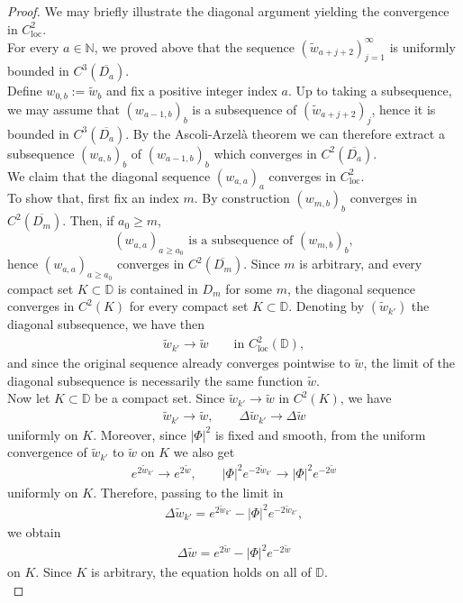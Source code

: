 \documentclass[a4paper,11pt,openright,twoside]{book}
\newcommand{\N}{\mathbb{N}}
\newcommand{\1}{\mathds{1}}
\newcommand{\loc}{\mathrm{loc}}
\theoremstyle{plain}
\theoremstyle{definition}
\theoremstyle{remark}
\begin{document}
\begin{proof}
	We may briefly illustrate the diagonal argument yielding the convergence in $C^2_\loc$.\\
	For every $a\in \N$, we proved above that the sequence $(\tilde w_{a+j+2})_{j=1}^\infty$ is uniformly bounded in $C^3(\overline{D_a})$.\\
	Define $w_{0,b}:=\tilde w_b$ and fix a positive integer index $a$. Up to taking a subsequence, we may assume that $(w_{a-1,b})_b$ is a subsequence of $(\tilde w_{a+j+2})_j$, hence it is bounded in $C^3(\overline{D_a})$. By the Ascoli-Arzelà theorem we can therefore extract a subsequence $(w_{a,b})_b$ of $(w_{a-1,b})_b$ which converges in $C^2(\overline{D_a})$.\\
	We claim that the diagonal sequence $(w_{a,a})_a$ converges in $C^2_\loc$.\\
	To show that, first fix an index $m$. By construction $(w_{m,b})_b$ converges in $C^2(\overline{D_m})$. Then, if $a_0\geq m$,
	\[
	(w_{a,a})_{a\geq a_0} \text{ is a subsequence of } (w_{m,b})_b,
	\]
	hence $(w_{a,a})_{a\geq a_0}$ converges in $C^2(\overline{D_m})$. Since $m$ is arbitrary, and every compact set $K\subset \mathbb{D}$ is contained in $D_m$ for some $m$, the diagonal sequence converges in $C^2(K)$ for every compact set $K\subset \mathbb{D}$. Denoting by $(\tilde w_{k'})$ the diagonal subsequence, we have then
	\begin{align*}
		\tilde w_{k'}\to \tilde w \qquad \text{in } C^2_\loc(\mathbb{D}),
	\end{align*}
	and since the original sequence already converges pointwise to $\tilde w$, the limit of the diagonal subsequence is necessarily the same function $\tilde w$.\\


	Now let $K\subset \mathbb{D}$ be a compact set. Since $\tilde w_{k'}\to \tilde w$ in $C^2(K)$, we have
	\begin{align*}
		\tilde w_{k'}\to \tilde w,\qquad \Delta \tilde w_{k'}\to \Delta \tilde w
	\end{align*}
	uniformly on $K$. Moreover, since $|\Phi|^2$ is fixed and smooth, from the uniform convergence of $\tilde w_{k'}$ to $\tilde w$ on $K$ we also get
	\begin{align*}
		e^{2\tilde w_{k'}}\to e^{2\tilde w},\qquad |\Phi|^2e^{-2\tilde w_{k'}}\to |\Phi|^2e^{-2\tilde w}
	\end{align*}
	uniformly on $K$. Therefore, passing to the limit in
	\begin{align*}
		\Delta \tilde w_{k'}=e^{2\tilde w_{k'}}-|\Phi|^2e^{-2\tilde w_{k'}},
	\end{align*}
	we obtain
	\begin{align*}
		\Delta \tilde w=e^{2\tilde w}-|\Phi|^2e^{-2\tilde w}
	\end{align*}
	on $K$. Since $K$ is arbitrary, the equation holds on all of $\mathbb{D}$.\\


\end{proof}
\end{document}
